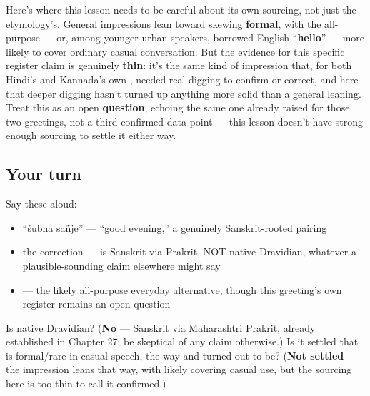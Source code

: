 \begin{culture}
Here's where this lesson needs to be careful about its own sourcing, not just the etymology's. General impressions lean toward \textbf{ } skewing \textbf{formal}, with the all-purpose \textbf{} — or, among younger urban speakers, borrowed English \textquotedblleft{}\textbf{hello}\textquotedblright{} — more likely to cover ordinary casual conversation. But the evidence for this specific register claim is genuinely \textbf{thin}: it's the same kind of impression that, for both Hindi's  and Kannada's own , needed real digging to confirm or correct, and here that deeper digging hasn't turned up anything more solid than a general leaning. Treat this as an open \textbf{question}, echoing the same one already raised for those two greetings, not a third confirmed data point — this lesson doesn't have strong enough sourcing to settle it either way.
\end{culture}

\subsection*{Your turn}
Say these aloud:

\begin{itemize}
\raggedright
  \item \textquotedblleft{}śubha sañje\textquotedblright{} — \textquotedblleft{}good evening,\textquotedblright{} a genuinely Sanskrit-rooted pairing
  \item the correction —  is Sanskrit-via-Prakrit, NOT native Dravidian, whatever a plausible-sounding claim elsewhere might say
  \item {} — the likely all-purpose everyday alternative, though this greeting's own register remains an open question
\end{itemize}

\begin{tcolorbox}[breakable,colback=teal!4,colframe=teal!35!black,title={Before you move on}]
Is  native Dravidian? (\textbf{No} — Sanskrit  via Maharashtri Prakrit, already established in Chapter 27; be skeptical of any claim otherwise.) Is it settled that   is formal/rare in casual speech, the way  and  turned out to be? (\textbf{Not settled} — the impression leans that way, with  likely covering casual use, but the sourcing here is too thin to call it confirmed.)
\end{tcolorbox}
